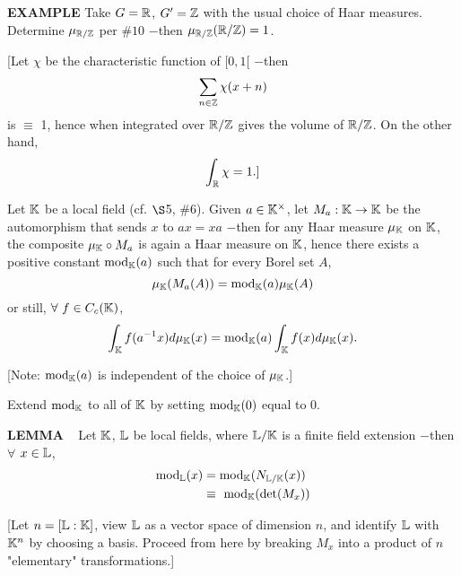\vspace{0.1cm}

\begin{x}{\small\bf EXAMPLE}
Take $G = \mathbb{R}$,  $G^\prime = \mathbb{Z}$ with the usual choice of Haar measures.  
Determine $\mu_{\mathbb{R}/\mathbb{Z}}$ per $\# 10$ $-$then $\mu_{\mathbb{R}/\mathbb{Z}}(\mathbb{R}/\mathbb{Z}) = 1$.

\vspace{0.1cm}

[Let $\chi$ be the characteristic function of $[0,1[$ $-$then
\[
\sum_{n \in \mathbb{Z}} \chi(x+n)
\]
is $\equiv$ 1, hence when integrated over $\mathbb{R}/\mathbb{Z}$ gives the volume of $\mathbb{R}/\mathbb{Z}$. 
On the other hand, 
\[
\int_{\mathbb{R}} \chi = 1.]
\]
\end{x}

\vspace{0.1cm}


Let $\mathbb{K}$ be a local field (cf. $\S$5, $\#6$).  
Given $a \in \mathbb{K}^\times$, let $M_a:\mathbb{K} \rightarrow \mathbb{K}$ be the automorphism that sends $x$ to $ax = xa$ 
$-$then for any Haar measure $\mu_{\mathbb{K}}$ on $\mathbb{K}$, the composite $\mu_{\mathbb{K}} \circ M_a$ is again a Haar measure on  $\mathbb{K}$, 
hence there exists a positive constant $\text{mod}_{\mathbb{K}}(a)$ such that for every Borel set $A$,
\[
\mu_{\mathbb{K}}(M_a(A)) = \text{mod}_{\mathbb{K}}(a)\mu_{\mathbb{K}}(A)
\]
or still, $\forall \ f \in C_c(\mathbb{K})$,
\[
\int_{\mathbb{K}} f(a^{-1}x)d\mu_{\mathbb{K}}(x) = \text{mod}_{\mathbb{K}}(a)\int_{\mathbb{K}} f(x)d\mu_{\mathbb{K}}(x).
\]

\vspace{0.1cm}

[Note: $\text{mod}_{\mathbb{K}}(a)$ is independent of the choice of $\mu_{\mathbb{K}}$.]

\vspace{0.2cm}

Extend $\text{mod}_{\mathbb{K}}$ to all of $\mathbb{K}$ by setting $\text{mod}_{\mathbb{K}}(0)$ equal to 0.

\vspace{0.1cm}

\begin{x}{\small\bf LEMMA} \ %
Let $\mathbb{K}$, $\mathbb{L}$ be local fields, where $\mathbb{L}/\mathbb{K}$ is a finite field extension $-$then $\forall$ $x \in \mathbb{L}$,
\[
\begin{aligned}
\text{mod}_{\mathbb{L}}(x) 
&= \text{mod}_{\mathbb{K}}(N_{\mathbb{L}/\mathbb{K}}(x)) \\
&\equiv \ \text{mod}_{\mathbb{K}}(\det(M_x))
\end{aligned}
\]

[Let $n = [\mathbb{L}:\mathbb{K}]$, view $\mathbb{L}$ as a vector space of dimension $n$, and identify $\mathbb{L}$ with $\mathbb{K}^n$ by choosing a basis.  
Proceed from here by breaking $M_x$ into a product of $n$ 
"elementary" transformations.]
\end{x}

